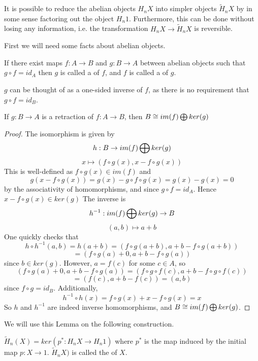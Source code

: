 It is possible to reduce the abelian objects $H_nX$ into simpler objects $\tilde{H}_nX$ by in some sense factoring out the object $H_n1$. Furthermore, this can be done without losing any information, i.e. the transformation $H_nX\rightarrow \tilde{H}_nX$ is reversible.

First we will need some facts about abelian objects.

\begin{definition}
If there exist maps $f:A\rightarrow B$ and $g:B\rightarrow A$ between abelian objects such that $g\circ f = id_A$ then $g$ is called a  of $f$, and $f$ is called a  of $g$.
\end{definition}

$g$ can be thought of as a one-sided inverse of $f$, as there is no requirement that $g\circ f=id_B$.

\begin{lemma}
If $g:B\rightarrow A$ is a retraction of $f:A\rightarrow B$, then $B\cong im(f)\bigoplus ker(g)$ 
\end{lemma}

\begin{proof}
\label{direct-sum-iso}
The isomorphism is given by $$h:B\rightarrow im(f)\bigoplus ker(g)$$
$$x \mapsto (f\circ g(x),x-f\circ g(x))$$
This is well-defined as $f\circ g(x)\in im(f)$ and 
$$g(x-f\circ g(x))=g(x)-g\circ f \circ g(x)=g(x)-g(x)=0$$
by the associativity of homomorphisms, and since $g\circ f= id_A$. Hence $x-f\circ g(x)\in ker(g)$
The inverse is $$h^{-1}:im(f)\bigoplus ker(g)\rightarrow B$$
$$(a,b)\mapsto a+b$$
One quickly checks that
$$h\circ h^{-1}(a,b)=h(a+b)=(f\circ g(a+b),a+b - f\circ g(a+b))$$
$$=(f\circ g(a)+0,a+b-f\circ g(a))$$
since $b\in ker(g)$. However, $a=f(c)$ for some $c\in A$, so
$$(f\circ g(a)+0,a+b-f\circ g(a))=(f\circ g \circ f(c),a+b-f\circ g \circ f(c))$$
$$=(f(c),a+b-f(c))=(a,b)$$
since $f\circ g=id_B$. Additionally,
$$h^{-1}\circ h(x)=f\circ g(x)+x-f\circ g(x)=x$$
So $h$ and $h^{-1}$ are indeed inverse homomorphisms, and $B\cong im(f)\bigoplus ker(g)$.
\end{proof}

We will use this Lemma on the following construction.

\begin{definition}
$\tilde{H}_n(X)=ker(p^*:H_nX\rightarrow H_n1)$ where $p^*$ is the map induced by the initial map $p:X\rightarrow 1$. $\tilde{H}_nX)$ is called the  of $X$.
\end{definition}


